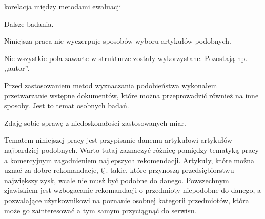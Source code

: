 \documentclass[pl]{minipw} %
\begin{document}
korelacja między metodami ewaluacji

Dalsze badania.

Niniejsza praca nie wyczerpuje sposobów wyboru artykułów podobnych. 

Nie wszystkie pola zawarte w strukturze zostały wykorzystane. Pozostają np. ,,autor''.

Przed zastosowaniem metod wyznaczania podobieństwa wykonałem przetwarzanie wstępne dokumentów, które można przeprowadzić również na inne sposoby. Jest to temat osobnych badań.

Zdaję sobie sprawę z niedoskonałości zastosowanych miar.

Tematem niniejszej pracy jest przypisanie danemu artykułowi artykułów najbardziej podobnych. Warto tutaj zaznaczyć różnicę pomiędzy tematyką pracy a komercyjnym zagadnieniem najlepszych rekomendacji. Artykuły, które można uznać za dobre rekomandacje, tj. takie, które przynoszą przedsiębiorstwu największy zysk, wcale nie musż być podobne do danego. Powszechnym zjawiskiem jest wzbogacanie rekomandacji o przedmioty niepodobne do danego, a pozwalające użytkownikowi na poznanie osobnej kategorii przedmiotów, która może go zainteresować a tym samym przyciągnąć do serwisu.
\end{document}
